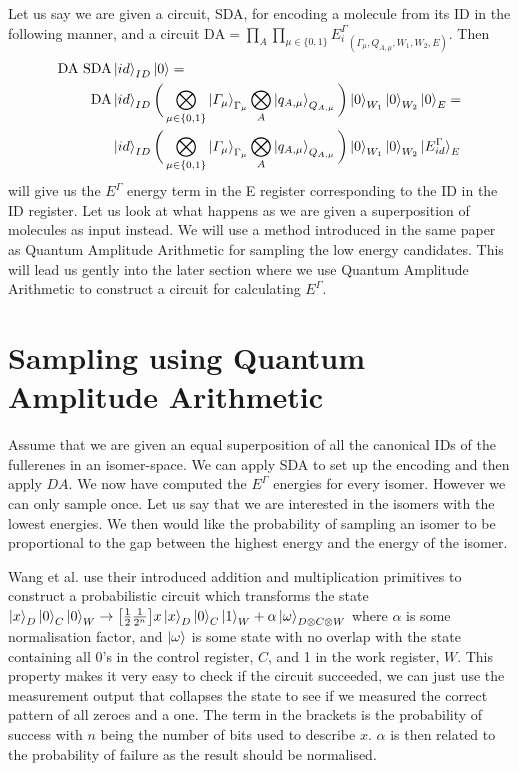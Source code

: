 


Let us say we are given a circuit, SDA, for encoding a molecule from its ID in the following manner, and a circuit $\text{DA}=\prod_{A}\prod_{\mu\in \{0,1\}} {E_i^\Gamma}_{(\Gamma_\mu,Q_{A,\mu},W_1,W_2,E)}$. Then 
\begin{equation}
\begin{split}
    \text{DA}\ \text{SDA}&\ket{id}_{ID}\ket{0}=\\
    \text{DA}&\ket{id}_{ID}\bigg(\bigotimes_{\mu\in \{0,1\}}\ket{\varGamma_\mu}_{\Gamma_\mu}\bigotimes_{A}\ket{q_{A,\mu}}_{Q_{A,\mu}}\bigg)\ket{0}_{W_1}\ket{0}_{W_2}\ket{0}_E =\\
    &\ket{id}_{ID}\bigg(\bigotimes_{\mu\in \{0,1\}}\ket{\varGamma_\mu}_{\Gamma_\mu}\bigotimes_{A}\ket{q_{A,\mu}}_{Q_{A,\mu}}\bigg)\ket{0}_{W_1}\ket{0}_{W_2}\ket{E^\Gamma_{id}}_E\\
\end{split}
\end{equation}
\noindent
will give us the $E^\Gamma$ energy term in the E register corresponding to the ID in the ID register.
Let us look at what happens as we are given a superposition of molecules as input instead. We will use a method introduced in the same paper\cite{wang2020} as Quantum Amplitude Arithmetic for sampling the low energy candidates. This will lead us gently into the later section where we use Quantum Amplitude Arithmetic to construct a circuit for calculating $E^\Gamma$.

\section{Sampling using Quantum Amplitude Arithmetic}
Assume that we are given an equal superposition of all the canonical IDs of the fullerenes in an isomer-space. We can apply SDA to set up the encoding and then apply $DA$. We now have computed the $E^\Gamma$ energies for every isomer. However we can only sample once.
Let us say that we are interested in the isomers with the lowest energies. We then would like the probability of sampling an isomer to be proportional to the gap between the highest energy and the energy of the isomer. 


\vspace{\baselineskip}
Wang et al. use their introduced addition and multiplication primitives to construct a probabilistic circuit which transforms the state $\ket{x}_D\ket{0}_C\ket{0}_W \to \big[\frac{1}{2}\frac{1}{2^n}\big]x\ket{x}_D\ket{0}_C\ket{1}_W+\alpha\ket{\omega}_{D \otimes C\otimes W}$ where $\alpha$ is some normalisation factor, and $\ket{\omega}$ is some state with no overlap with the state containing all 0's in the control register, $C$, and 1 in the work register, $W$.
This property makes it very easy to check if the circuit succeeded, we can just use the measurement output that collapses the state to see if we measured the correct pattern of all zeroes and a one. The term in the brackets is the probability of success with $n$ being the number of bits used to describe $x$. $\alpha$ is then related to the probability of failure as the result should be normalised. 



